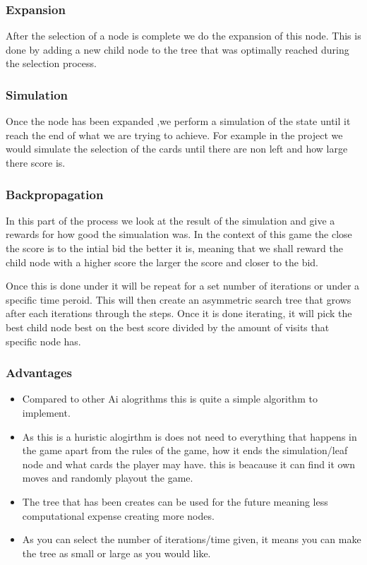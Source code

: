 \subsubsection{Expansion}
After the selection of a node is complete we do the expansion of this node. This is done by adding a new child node to the tree that was optimally reached during the selection process\cite{mctsSource}.
\subsubsection{Simulation}
Once the  node has been expanded ,we perform a simulation of the state until it reach the end of what we are trying to achieve. For example in  the project we would simulate the selection of the cards until there are non left and how large there score is.
\subsubsection{Backpropagation}
In this part of the process we look at the result of the simulation and give a rewards for how good the simualation was. In the context of this game the close the score is to the intial bid the better it is, meaning that we shall reward the child node with a higher score the larger the score and closer to the bid.


Once this is done under it will be repeat for a set number of iterations or under a specific time peroid. This will then create an asymmetric search tree that grows after each iterations through the steps. Once it is done iterating, it will pick the best child node best on the best score divided by the amount of visits that specific node has.
\subsubsection{Advantages}
\begin{itemize}
\item Compared to other Ai alogrithms this is quite a simple algorithm to implement.
\item As this is a huristic alogirthm is does not need to everything that happens in the game apart from the rules of the game, how it ends the simulation/leaf node and what cards the player may have. this is beacause it can find it own moves and randomly playout the game.
\item The tree that has been creates can be used for the future meaning less computational expense creating more nodes.
\item As you can select the number of iterations/time given, it means you can make the tree as small or large as you would like. 
\end{itemize}
